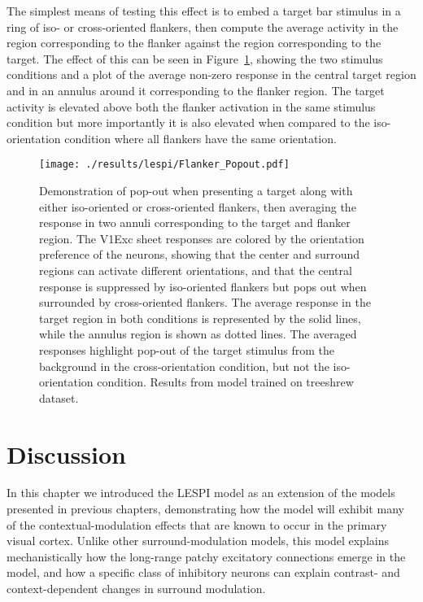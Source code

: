 The simplest means of testing this effect is to embed a target bar
stimulus in a ring of iso- or cross-oriented flankers, then compute
the average activity in the region corresponding to the flanker
against the region corresponding to the target. The
effect of this can be seen in Figure~\ref{Flanker_PopOut}, showing the
two stimulus conditions and a plot of the average non-zero response in
the central target region and in an annulus around it corresponding to
the flanker region. The target activity is elevated above both the
flanker activation in the same stimulus condition but more importantly
it is also elevated when compared to the iso-orientation condition
where all flankers have the same orientation.

\begin{figure}
	\centering
        \texttt{[image: ./results/lespi/Flanker\_Popout.pdf]}
	\caption[Pop-out effect in simple flanker paradigm.]{Demonstration
      of pop-out when presenting a target along with either
      iso-oriented or cross-oriented flankers, then averaging the
      response in two annuli corresponding to the target and flanker
      region. The V1Exc sheet responses are colored by the
      orientation preference of the neurons, showing that the center
      and surround regions can activate different orientations, and
      that the central response is suppressed by iso-oriented flankers
      but pops out when surrounded by cross-oriented flankers.
      The average response in the target region in both
      conditions is represented by the solid lines, while the annulus
      region is shown as dotted lines. The averaged responses
      highlight pop-out of the target stimulus from the background in
      the cross-orientation condition, but not the iso-orientation
      condition. Results from model trained on treeshrew dataset.}
	\label{Flanker_PopOut}
\end{figure}

\section{Discussion}

In this chapter we introduced the LESPI model as an extension of the
models presented in previous chapters, demonstrating how the model
will exhibit many of the contextual-modulation effects that are known
to occur in the primary visual cortex. Unlike other
surround-modulation models, this model explains mechanistically how
the long-range patchy excitatory connections emerge in the model, and
how a specific class of inhibitory neurons can explain contrast- and
context-dependent changes in surround modulation.

